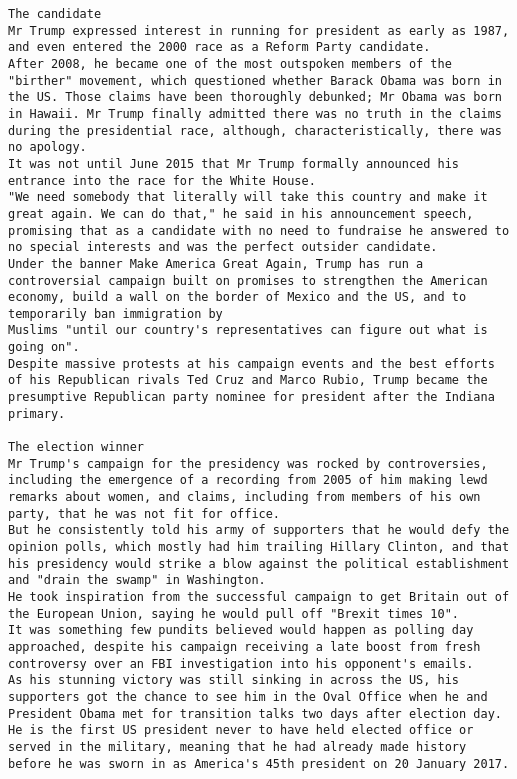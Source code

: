 \begin{lstlisting}
The candidate
Mr Trump expressed interest in running for president as early as 1987, and even entered the 2000 race as a Reform Party candidate. 
After 2008, he became one of the most outspoken members of the "birther" movement, which questioned whether Barack Obama was born in the US. Those claims have been thoroughly debunked; Mr Obama was born in Hawaii. Mr Trump finally admitted there was no truth in the claims during the presidential race, although, characteristically, there was no apology. 
It was not until June 2015 that Mr Trump formally announced his entrance into the race for the White House. 
"We need somebody that literally will take this country and make it great again. We can do that," he said in his announcement speech, promising that as a candidate with no need to fundraise he answered to no special interests and was the perfect outsider candidate. 
Under the banner Make America Great Again, Trump has run a controversial campaign built on promises to strengthen the American economy, build a wall on the border of Mexico and the US, and to temporarily ban immigration by 
Muslims "until our country's representatives can figure out what is going on". 
Despite massive protests at his campaign events and the best efforts of his Republican rivals Ted Cruz and Marco Rubio, Trump became the presumptive Republican party nominee for president after the Indiana primary. 
 
The election winner 
Mr Trump's campaign for the presidency was rocked by controversies, including the emergence of a recording from 2005 of him making lewd remarks about women, and claims, including from members of his own party, that he was not fit for office. 
But he consistently told his army of supporters that he would defy the opinion polls, which mostly had him trailing Hillary Clinton, and that his presidency would strike a blow against the political establishment and "drain the swamp" in Washington. 
He took inspiration from the successful campaign to get Britain out of the European Union, saying he would pull off "Brexit times 10". 
It was something few pundits believed would happen as polling day approached, despite his campaign receiving a late boost from fresh controversy over an FBI investigation into his opponent's emails. 
As his stunning victory was still sinking in across the US, his supporters got the chance to see him in the Oval Office when he and President Obama met for transition talks two days after election day. 
He is the first US president never to have held elected office or served in the military, meaning that he had already made history before he was sworn in as America's 45th president on 20 January 2017. 
\end{lstlisting}

